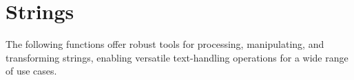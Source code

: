 \section{Strings}
\label{Strings}
\begin{NexMainBox}
	\begin{NexMainBox}
		The following functions offer robust tools for processing, manipulating, and transforming strings, enabling versatile text-handling operations for a wide range of use cases.
	\end{NexMainBox}
	\begin{NexMainBox}
		\begin{NexListDark}
		\end{NexListDark}
	\end{NexMainBox}
\end{NexMainBox}


